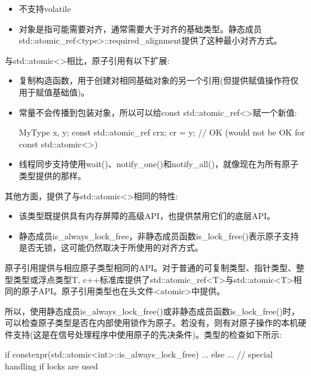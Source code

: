 \begin{itemize}
\item 
不支持volatile

\item
对象是指可能需要对齐，通常需要大于对齐的基础类型。静态成员std::atomic\_ref<type>::required\_alignment提供了这种最小对齐方式。
\end{itemize}

与std::atomic<>相比，原子引用有以下扩展:

\begin{itemize}
\item 
复制构造函数，用于创建对相同基础对象的另一个引用(但提供赋值操作符仅用于赋值基础值)。

\item 
常量不会传播到包装对象，所以可以给const std::atomic\_ref<>赋一个新值:

\begin{cpp}
MyType x, y;
const std::atomic_ref cr{x};
cr = y; // OK (would not be OK for const std::atomic<>)
\end{cpp}

\item 
线程同步支持使用wait()、notify\_one()和notify\_all()，就像现在为所有原子类型提供的那样。
\end{itemize}

其他方面，提供了与std::atomic<>相同的特性:

\begin{itemize}
\item 
该类型既提供具有内存屏障的高级API，也提供禁用它们的底层API。

\item 
静态成员is\_always\_lock\_free，非静态成员函数is\_lock\_free()表示原子支持是否无锁，这可能仍然取决于所使用的对齐方式。
\end{itemize}


原子引用提供与相应原子类型相同的API。对于普通的可复制类型、指针类型、整型类型或浮点类型T, c++标准库提供了std::atomic\_ref<T>与std::atomic<T>相同的原子API。原子引用类型也在头文件<atomic>中提供。

所以，使用静态成员is\_always\_lock\_free()或非静态成员函数is\_lock\_free()时，可以检查原子类型是否在内部使用锁作为原子。若没有，则有对原子操作的本机硬件支持(这是在信号处理程序中使用原子的先决条件)。类型的检查如下所示:

\begin{cpp}
if constexpr(std::atomic<int>::is_always_lock_free) {
	...
}
else {
	... // special handling if locks are used
}
\end{cpp}

